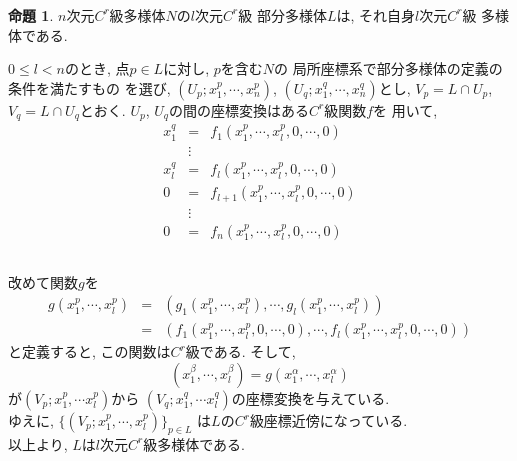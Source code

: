 \documentclass[dvipdfmx,cjk]{beamer}
\theoremstyle{definition}
\newtheorem{prop}[dfn]{\textbf{ 命題 }}
\begin{document}
\begin{frame}
  \frametitle{}
  \begin{prop}\label{prop:dim of C^r-submanifold}
    $n$次元$C^r$級多様体$N$の$l$次元$C^r$級
    部分多様体$L$は, それ自身$l$次元$C^r$級
    多様体である. 
  \end{prop}
  $0\leq l<n$のとき, 点$p\in L$に対し, $p$を含む$N$の
  局所座標系で部分多様体の定義の条件を満たすもの
  を選び, $(U_p;x^p_1,\cdots ,x^p_n)$, 
  $(U_q;x^q_1,\cdots ,x^q_n)$とし,  
  $V_p=L\cap U_p$, $V_q=L\cap U_q$とおく.  
  $U_p$, $U_q$の間の座標変換はある$C^r$級関数$f$を
  用いて, 
  \begin{eqnarray*}
      x^q_1&=&f_1(x^p_1, \cdots ,x^p_l,0,\cdots ,0)\\
      &\vdots & \\
      x^q_l&=&f_l(x^p_1, \cdots ,x^p_l,0,\cdots ,0)\\
      0&=&f_{l+1}(x^p_1, \cdots ,x^p_l,0,\cdots ,0)\\
      &\vdots & \\
      0&=&f_n(x^p_1, \cdots ,x^p_l,0,\cdots ,0)\\
  \end{eqnarray*}
\end{frame}
\begin{frame}
  \frametitle{}
  改めて関数$g$を
  \begin{eqnarray*}
  g(x^p_1, \cdots ,x^p_l)&=&
  (g_1(x^p_1, \cdots ,x^p_l), \cdots 
  , g_l(x^p_1, \cdots ,x^p_l))\\
  &=&(f_1(x^p_1, \cdots ,x^p_l,0,\cdots ,0), \cdots 
  , f_l(x^p_1, \cdots ,x^p_l,0,\cdots ,0))
  \end{eqnarray*}
  と定義すると, この関数は$C^r$級である. 
  そして, 
  $$(x^\beta_1, \cdots ,x^\beta_l)
  =g(x^\alpha_1, \cdots ,x^\alpha_l)$$
  が$(V_p;x^p_1,\cdots x^p_l)$から
  $(V_q;x^q_1,\cdots x^q_l)$の座標変換を与えている. \\
  ゆえに, $\{(V_p;x^p_1,\cdots ,x^p_l)\}_{p\in L}$
  は$L$の$C^r$級座標近傍になっている. \\
  以上より, $L$は$l$次元$C^r$級多様体である. 
\end{frame}
\end{document}
